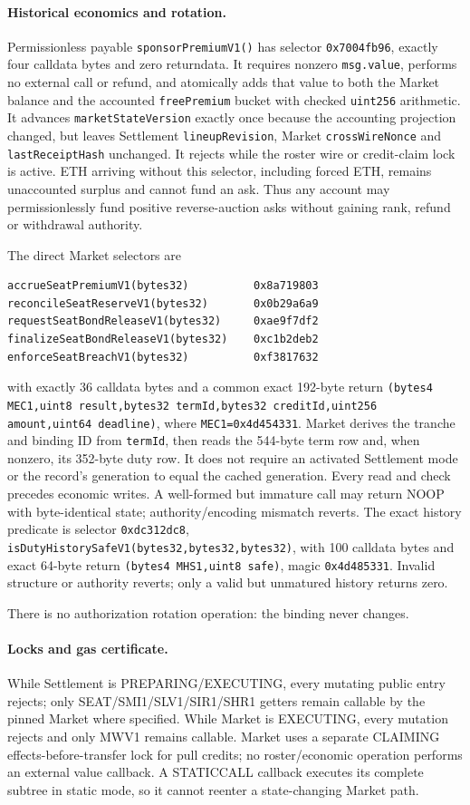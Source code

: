 \documentclass[a4paper,11pt]{article}
\newcommand{\code}[1]{\nolinkurl{#1}}
\begin{document}
\paragraph{Historical economics and rotation.}
Permissionless payable \code{sponsorPremiumV1()} has selector
\code{0x7004fb96}, exactly four calldata bytes and zero returndata.  It requires
nonzero \code{msg.value}, performs no external call or refund, and atomically
adds that value to both the Market balance and the accounted
\code{freePremium} bucket with checked \code{uint256} arithmetic.  It advances
\code{marketStateVersion} exactly once because the accounting projection
changed, but leaves Settlement \code{lineupRevision}, Market
\code{crossWireNonce} and \code{lastReceiptHash} unchanged.  It rejects while
the roster wire or credit-claim lock is active.  ETH arriving without this
selector, including forced ETH, remains unaccounted surplus and cannot fund an
ask.  Thus any account may permissionlessly fund positive reverse-auction asks
without gaining rank, refund or withdrawal authority.

The direct Market selectors are
\begin{verbatim}
accrueSeatPremiumV1(bytes32)          0x8a719803
reconcileSeatReserveV1(bytes32)       0x0b29a6a9
requestSeatBondReleaseV1(bytes32)     0xae9f7df2
finalizeSeatBondReleaseV1(bytes32)    0xc1b2deb2
enforceSeatBreachV1(bytes32)          0xf3817632
\end{verbatim}
with exactly 36 calldata bytes and a common exact 192-byte return
\code{(bytes4 MEC1,uint8 result,bytes32 termId,bytes32 creditId,uint256
amount,uint64 deadline)}, where \code{MEC1=0x4d454331}.  Market derives the
tranche and binding ID from \code{termId}, then reads the
544-byte term row and, when nonzero, its 352-byte duty row.  It does not require
an activated Settlement mode or the record's generation to equal the cached
generation.
Every read and check precedes economic writes.  A well-formed but immature call
may return NOOP with byte-identical state; authority/encoding mismatch reverts.
The exact history predicate is selector \code{0xdc312dc8},
\code{isDutyHistorySafeV1(bytes32,bytes32,bytes32)}, with 100 calldata bytes
and exact 64-byte return \code{(bytes4 MHS1,uint8 safe)}, magic
\code{0x4d485331}.  Invalid structure or authority reverts; only a valid but
unmatured history returns zero.

There is no authorization rotation operation: the binding never changes.

\paragraph{Locks and gas certificate.}
While Settlement is PREPARING/EXECUTING, every mutating public entry rejects;
only SEAT/SMI1/SLV1/SIR1/SHR1 getters remain callable by the pinned Market
where specified.  While Market is EXECUTING, every mutation rejects and only
MWV1 remains callable.  Market uses a separate CLAIMING effects-before-transfer
lock for pull credits; no roster/economic operation performs an external value
callback.  A STATICCALL callback executes its complete subtree in static mode,
so it cannot reenter a state-changing Market path.
\end{document}

